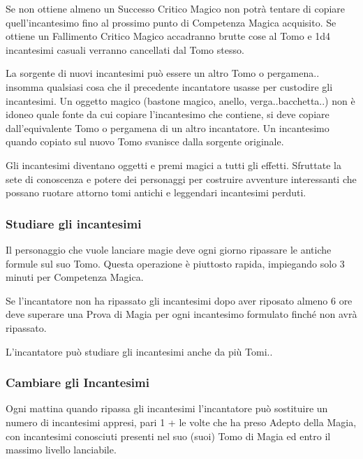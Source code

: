 \begin{multicols}{2}
Se non ottiene almeno un Successo Critico Magico non potrà tentare di copiare quell'incantesimo fino al prossimo punto di Competenza Magica acquisito. Se ottiene un Fallimento Critico Magico accadranno brutte cose al Tomo e 1d4 incantesimi casuali verranno cancellati dal Tomo stesso.

La sorgente di nuovi incantesimi può essere un altro Tomo o pergamena.. insomma qualsiasi cosa che il precedente incantatore usasse per custodire gli incantesimi. Un oggetto magico (bastone magico, anello, verga..bacchetta..) non è idoneo quale fonte da cui copiare l'incantesimo che contiene, si deve copiare dall'equivalente Tomo o pergamena di un altro incantatore. Un incantesimo quando copiato sul nuovo Tomo svanisce dalla sorgente originale.

\begin{changemargin}{0.3cm}{0.3cm}\begin{narratore}
Gli incantesimi diventano oggetti e premi magici a tutti gli effetti. Sfruttate la sete di conoscenza e potere dei personaggi per costruire avventure interessanti che possano ruotare attorno tomi antichi e leggendari incantesimi perduti.
\end{narratore}\end{changemargin}

\subsubsection{Studiare gli incantesimi}\label{magiestudiareincantesimi}

Il personaggio che vuole lanciare magie deve ogni giorno ripassare le antiche formule sul suo Tomo. Questa operazione è piuttosto rapida, impiegando solo 3 minuti per Competenza Magica.

Se l'incantatore non ha ripassato gli incantesimi dopo aver riposato almeno 6 ore deve superare una Prova di Magia per ogni incantesimo formulato finché non avrà ripassato.

L'incantatore può studiare gli incantesimi anche da più Tomi..

\subsubsection{Cambiare gli Incantesimi}\label{Cambiare gli Incantesimi}

Ogni mattina quando ripassa gli incantesimi l'incantatore può sostituire un numero di incantesimi appresi, pari 1 + le volte che ha preso Adepto della Magia, con incantesimi conosciuti presenti nel suo (suoi) Tomo di Magia ed entro il massimo livello lanciabile.


\end{multicols}
